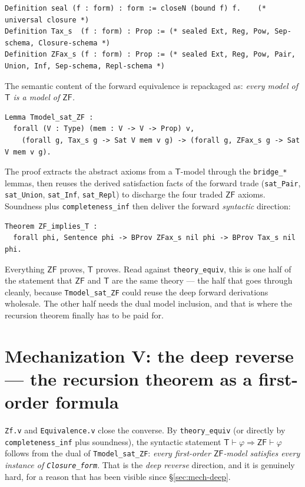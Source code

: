 \documentclass[11pt]{article}
\theoremstyle{plain}
\theoremstyle{definition}
\newcommand{\ZF}{\mathsf{ZF}}
\renewcommand{\ZF}{\textsf{ZF}}
\newcommand{\T}{\textsf{T}}
\newcommand{\proves}{\vdash}
\newcommand{\cq}[1]{\lstinline[basicstyle=\ttfamily]|#1|}
\begin{document}
\begin{lstlisting}
Definition seal (f : form) : form := closeN (bound f) f.    (* universal closure *)
Definition Tax_s  (f : form) : Prop := (* sealed Ext, Reg, Pow, Sep-schema, Closure-schema *)
Definition ZFax_s (f : form) : Prop := (* sealed Ext, Reg, Pow, Pair, Union, Inf, Sep-schema, Repl-schema *)
\end{lstlisting}

The semantic content of the forward equivalence is repackaged as: \emph{every model
of $\T$ is a model of $\ZF$.}

\begin{lstlisting}
Lemma Tmodel_sat_ZF :
  forall (V : Type) (mem : V -> V -> Prop) v,
    (forall g, Tax_s g -> Sat V mem v g) -> (forall g, ZFax_s g -> Sat V mem v g).
\end{lstlisting}

The proof extracts the abstract axioms from a $\T$-model through the \cq{bridge_*}
lemmas, then reuses the derived satisfaction facts of the forward trade (\cq{sat_Pair},
\cq{sat_Union}, \cq{sat_Inf}, \cq{sat_Repl}) to discharge the four traded $\ZF$
axioms. Soundness plus \cq{completeness_inf} then deliver the forward
\emph{syntactic} direction:

\begin{lstlisting}
Theorem ZF_implies_T :
  forall phi, Sentence phi -> BProv ZFax_s nil phi -> BProv Tax_s nil phi.
\end{lstlisting}

Everything $\ZF$ proves, $\T$ proves. Read against \cq{theory_equiv}, this is one
half of the statement that $\ZF$ and $\T$ are the same theory --- the half that
goes through cleanly, because \cq{Tmodel_sat_ZF} could reuse the deep forward
derivations wholesale. The other half needs the dual model inclusion, and
that is where the recursion theorem finally has to be paid for.

\section{Mechanization V: the deep reverse --- the recursion theorem as a first-order formula}\label{sec:mech-deeprev}

\texttt{Zf.v} and \texttt{Equivalence.v} close the converse. By
\cq{theory_equiv} (or directly by \cq{completeness_inf} plus soundness), the
syntactic statement $\T \proves \varphi \Rightarrow \ZF \proves \varphi$ follows
from the dual of \cq{Tmodel_sat_ZF}: \emph{every first-order $\ZF$-model
satisfies every instance of \cq{Closure_form}}. That is the \emph{deep reverse}
direction, and it is genuinely hard, for a reason that has been visible since
\S\ref{sec:mech-deep}.
\end{document}
